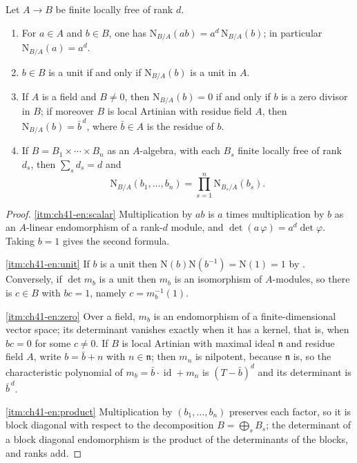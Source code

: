 \begin{lemma}
\label{lem:ch41-element-norm}
Let $A\to B$ be finite locally free of rank $d$.
\begin{enumerate}
\item\label{itm:ch41-en:scalar}
      For $a\in A$ and $b\in B$, one has
      $\mathrm N_{B/A}(ab)=a^d\,\mathrm N_{B/A}(b)$; in particular
      $\mathrm N_{B/A}(a)=a^d$.
\item\label{itm:ch41-en:unit}
      $b\in B$ is a unit if and only if $\mathrm N_{B/A}(b)$ is a unit
      in $A$.
\item\label{itm:ch41-en:zero}
      If $A$ is a field and $B\ne0$, then
      $\mathrm N_{B/A}(b)=0$ if and only if $b$ is a zero divisor in
      $B$; if moreover $B$ is local Artinian with residue field $A$,
      then $\mathrm N_{B/A}(b)=\bar b^{\,d}$, where
      $\bar b\in A$ is the residue of $b$.
\item\label{itm:ch41-en:product}
      If $B=B_1\times\cdots\times B_n$ as an $A$-algebra, with each
      $B_s$ finite locally free of rank $d_s$, then $\sum_sd_s=d$ and
      \[
       \mathrm N_{B/A}(b_1,\dots,b_n)
       =\prod_{s=1}^n\mathrm N_{B_s/A}(b_s).
      \]
\end{enumerate}
\end{lemma}

\begin{proof}
\cref{itm:ch41-en:scalar}  Multiplication by $ab$ is $a$ times
multiplication by $b$ as an $A$-linear endomorphism of a rank-$d$
module, and $\det(a\,\varphi)=a^d\det\varphi$.  Taking $b=1$ gives the
second formula.

\cref{itm:ch41-en:unit}  If $b$ is a unit then
$\mathrm N(b)\mathrm N(b^{-1})=\mathrm N(1)=1$ by
.  Conversely, if $\det m_b$ is a unit
then $m_b$ is an isomorphism of $A$-modules, so there is $c\in B$
with $bc=1$, namely $c=m_b^{-1}(1)$.

\cref{itm:ch41-en:zero}  Over a field, $m_b$ is an endomorphism of a
finite-dimensional vector space; its determinant vanishes exactly when it
has a kernel, that is, when $bc=0$ for some $c\ne0$.  If $B$ is local
Artinian with maximal ideal $\mathfrak n$ and residue field $A$, write
$b=\bar b+n$ with $n\in\mathfrak n$; then $m_n$ is nilpotent, because
$\mathfrak n$ is, so the characteristic polynomial of
$m_b=\bar b\cdot\operatorname{id}+m_n$ is $(T-\bar b)^d$ and its
determinant is $\bar b^{\,d}$.

\cref{itm:ch41-en:product}  Multiplication by $(b_1,\dots,b_n)$ preserves
each factor, so it is block diagonal with respect to the decomposition
$B=\bigoplus_sB_s$; the determinant of a block diagonal endomorphism is
the product of the determinants of the blocks, and ranks add.
\end{proof}

